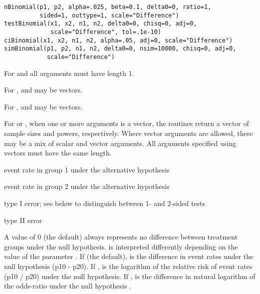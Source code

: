\begin{Usage}
\begin{verbatim}
nBinomial(p1, p2, alpha=.025, beta=0.1, delta0=0, ratio=1,
          sided=1, outtype=1, scale="Difference") 
testBinomial(x1, x2, n1, n2, delta0=0, chisq=0, adj=0,
             scale="Difference", tol=.1e-10)
ciBinomial(x1, x2, n1, n2, alpha=.05, adj=0, scale="Difference")
simBinomial(p1, p2, n1, n2, delta0=0, nsim=10000, chisq=0, adj=0,
            scale="Difference")
\end{verbatim}
\end{Usage}
\begin{Arguments}
For  and  all arguments must have length 1.

For ,  and  may be vectors.

For ,  and  may be vectors.

For  or , when one or more arguments is a vector, the routines return a vector of sample sizes and powers, respectively.
Where vector arguments are allowed, there may be a mix of scalar and vector arguments. 
All arguments specified using vectors must have the same length.  

\begin{ldescription}
\item[\code{p1}] event rate in group 1 under the alternative hypothesis
\item[\code{p2}] event rate in group 2 under the alternative hypothesis
\item[\code{alpha}] type I error; see  below to distinguish between 1- and 2-sided tests
\item[\code{beta}] type II error
\item[\code{delta0}] A value of 0 (the default) always represents no difference between treatment groups under the null hypothesis.
 is interpreted differently depending on the value of the parameter . 
If  (the default),  is the difference in event rates under the null hypothesis (p10 - p20).
If ,  is the logarithm of the relative risk of event rates (p10 / p20) under the null hypothesis.
If ,  is the difference in natural logarithm of the odds-ratio under the null hypothesis
.


\end{ldescription}
\end{Arguments}
